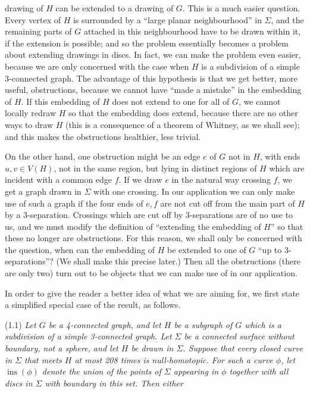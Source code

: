 \noindent drawing of $H$ can be extended to a drawing of $G$. This is a much easier question. Every vertex of $H$ is surrounded by a ``large planar neighbourhood'' in $\Sigma$, and the remaining parts of $G$ attached in this neighbourhood have to be drawn within it, if the extension is possible; and so the problem essentially becomes a problem about extending drawings in discs. In fact, we can make the problem even easier, because we are only concerned with the case when $H$ is a subdivision of a simple 3-connected graph. The advantage of this hypothesis is that we get better, more useful, obstructions, because we cannot have ``made a mistake'' in the embedding of $H$. If this embedding of $H$ does not extend to one for all of $G$, we cannot locally redraw $H$ so that the embedding does extend, because there are no other ways to draw $H$ (this is a consequence of a theorem of Whitney, as we shall see); and this makes the obstructions healthier, less trivial.

On the other hand, one obstruction might be an edge $e$ of $G$ not in $H$, with ends $u, v \in V(H)$, not in the same region, but lying in distinct regions of $H$ which are incident with a common edge $f$. If we draw $e$ in the natural way crossing $f$, we get a graph drawn in $\Sigma$ with one crossing. In our application we can only make use of such a graph if the four ends of $e, f$ are not cut off from the main part of $H$ by a 3-separation. Crossings which are cut off by 3-separations are of no use to us, and we must modify the definition of ``extending the embedding of $H$'' so that these no longer are obstructions. For this reason, we shall only be concerned with the question, when can the embedding of $H$ be extended to one of $G$ ``up to 3-separations''? (We shall make this precise later.) Then all the obstructions (there are only two) turn out to be objects that we can make use of in our application.

In order to give the reader a better idea of what we are aiming for, we first state a simplified special case of the result, as follows.

\stmt
(1.1) \textit{Let $G$ be a 4-connected graph, and let $H$ be a subgraph of $G$ which is a subdivision of a simple 3-connected graph. Let $\Sigma$ be a connected surface without boundary, not a sphere, and let $H$ be drawn in $\Sigma$. Suppose that every closed curve in $\Sigma$ that meets $H$ at most 208 times is null-homotopic. For such a curve $\phi$, let $\operatorname{ins}(\phi)$ denote the union of the points of $\Sigma$ appearing in $\phi$ together with all discs in $\Sigma$ with boundary in this set. Then either}

